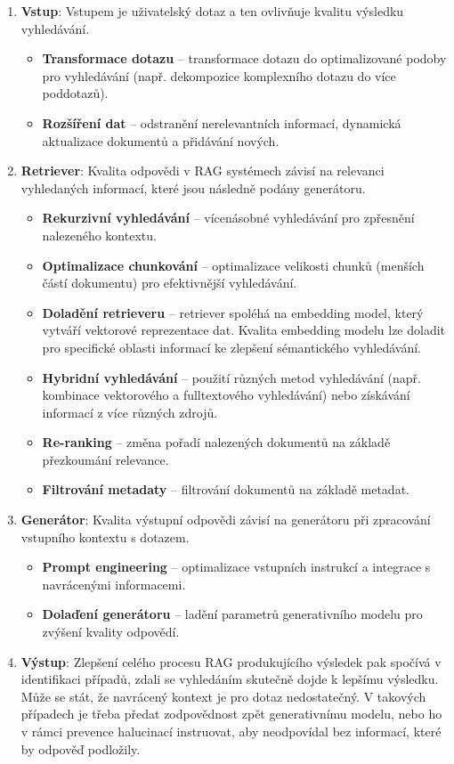 \begin{enumerate}
    \item \textbf{Vstup}: Vstupem je uživatelský dotaz a ten ovlivňuje kvalitu výsledku vyhledávání.
    \begin{itemize}
        \item \textbf{Transformace dotazu} – transformace dotazu do optimalizované podoby pro vyhledávání (např. dekompozice komplexního dotazu do více poddotazů).
        \item \textbf{Rozšíření dat} – odstranění nerelevantních informací, dynamická aktualizace dokumentů a přidávání nových.
    \end{itemize}
    
    \item \textbf{Retriever}: Kvalita odpovědi v RAG systémech závisí na relevanci vyhledaných informací, které jsou následně podány generátoru.
    \begin{itemize}
        \item \textbf{Rekurzivní vyhledávání} – vícenásobné vyhledávání pro zpřesnění nalezeného kontextu.
        \item \textbf{Optimalizace chunkování} – optimalizace velikosti chunků (menších částí dokumentu) pro efektivnější vyhledávání.
        \item \textbf{Doladění retrieveru} – retriever spoléhá na embedding model, který vytváří vektorové reprezentace dat. Kvalita embedding modelu lze doladit pro specifické oblasti informací ke zlepšení sémantického vyhledávání.
        \item \textbf{Hybridní vyhledávání} – použití různých metod vyhledávání (např. kombinace vektorového a fulltextového vyhledávání) nebo získávání informací z více různých zdrojů.
        \item \textbf{Re-ranking} – změna pořadí nalezených dokumentů na základě přezkoumání relevance.
        \item \textbf{Filtrování metadaty} – filtrování dokumentů na základě metadat.
    \end{itemize}
    
    \item \textbf{Generátor}: Kvalita výstupní odpovědi závisí na generátoru při zpracování vstupního kontextu s dotazem.
    \begin{itemize}
        \item \textbf{Prompt engineering} – optimalizace vstupních instrukcí a integrace s navrácenými informacemi.
        \item \textbf{Dolaďení generátoru} – ladění parametrů generativního modelu pro zvýšení kvality odpovědí.
    \end{itemize}

    \item \textbf{Výstup}: Zlepšení celého procesu RAG produkujícího výsledek pak spočívá v identifikaci případů, zdali se vyhledáním skutečně dojde k lepšímu výsledku. Může se stát, že navrácený kontext je pro dotaz nedostatečný. V takových případech je třeba předat zodpovědnost zpět generativnímu modelu, nebo ho v rámci prevence halucinací instruovat, aby neodpovídal bez informací, které by odpověď podložily.
\end{enumerate}

